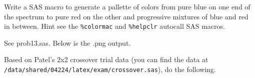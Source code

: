 \documentclass[12pt,answers]{exam}
\begin{document}
\begin{questions}
\question Write a SAS macro to generate a pallette of
colors from pure blue on one end of the spectrum to pure red on the
other and progressive mixtures of blue and red in between.  Hint see
the {\tt \%colormac} and {\tt \%helpclr} autocall SAS macros.

\begin{solution}
See prob13.sas. Below is the .png output.
\end{solution}

\begin{center}
\end{center}

\pagebreak

\question Based on Patel's 2x2 crossover trial data (you can find 
the data at \\
{\tt /data/shared/04224/latex/exam/crossover.sas}), do the following.
\end{questions}
\end{document}
